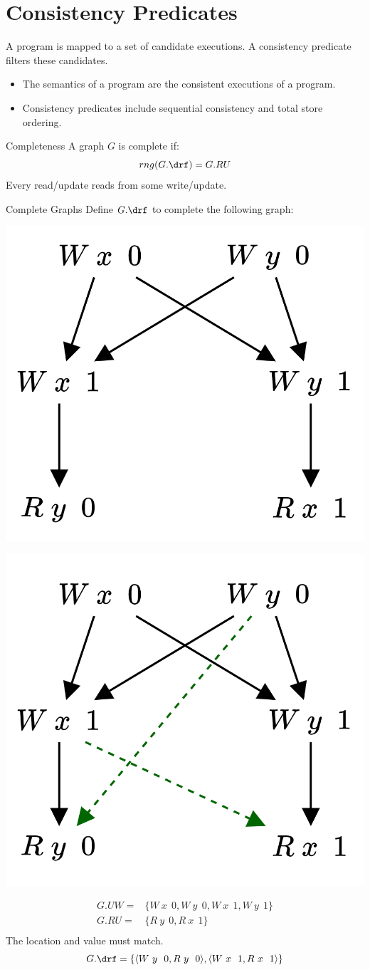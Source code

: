 \section{Consistency Predicates}
A program is mapped to a set of candidate executions. A consistency predicate filters these candidates.
\begin{itemize}
	\item The semantics of a program are the consistent executions of a program.
	\item Consistency predicates include sequential consistency and total store ordering.
\end{itemize}

\begin{definitionbox}{Completeness}
	A graph $G$ is complete if:
	\[rng(G.\drf) = G.RU\]
	Every read/update reads from some write/update.
\end{definitionbox}
\begin{examplebox}{Complete Graphs}
	Define $G.\drf$ to complete the following graph:
	\begin{center}
		\includegraphics[width=.3\textwidth]{declarative_semantics/images/example_complete_graphs.drawio.png}
	\end{center}
	\tcblower
	\begin{center}
		\includegraphics[width=.3\textwidth]{declarative_semantics/images/example_complete_graphs_answer.drawio.png}
	\end{center}
	\[\begin{split}
			G.UW =&  \{W \ x \ \ 0, W \ y \ \ 0, W \ x \ \ 1, W \ y \ \ 1 \}\\
			G.RU = & \{R \ y \ \ 0, R \ x \ \ 1 \} \\
		\end{split}\]
	The location and value must match.
	\[G.\drf = \{\langle W \ y \ \ 0, R \ y \ \ 0 \rangle, \langle W \ x \ \ 1, R \ x \ \ 1\rangle\}\]
\end{examplebox}

